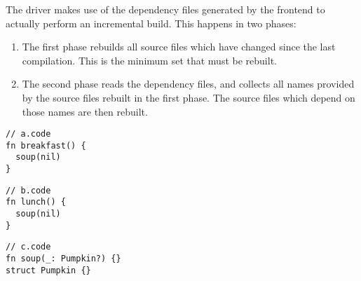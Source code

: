 \documentclass[../generics]{subfiles}
\begin{document}
The driver makes use of the dependency files generated by the frontend to actually perform an incremental build. This happens in two phases:
\begin{enumerate}
\item The first phase rebuilds all source files which have changed since the last compilation. This is the minimum set that must be rebuilt.
\item The second phase reads the dependency files, and collects all names provided by the source files rebuilt in the first phase. The source files which depend on those names are then rebuilt.
\end{enumerate}

\begin{listing}[b!]\label{dependencyexample}
\begin{Verbatim}
// a.code
fn breakfast() {
  soup(nil)
}
\end{Verbatim}
\begin{Verbatim}
// b.code
fn lunch() {
  soup(nil)
}
\end{Verbatim}
\begin{Verbatim}
// c.code
fn soup(_: Pumpkin?) {}
struct Pumpkin {}
\end{Verbatim}
\end{listing}
\end{document}
